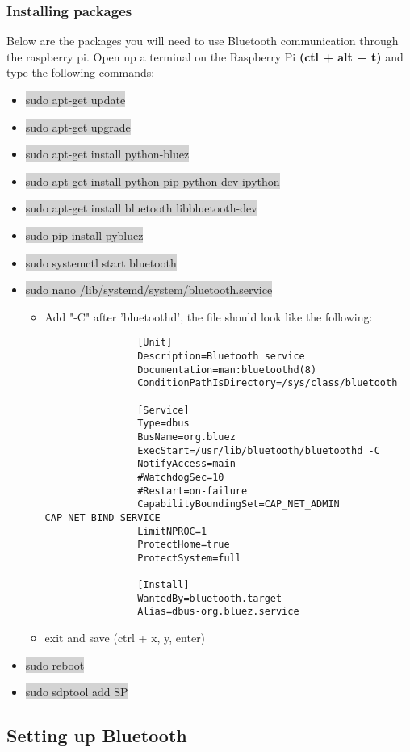 \documentclass[12pt]{article}
\begin{document}
\subsubsection{Installing packages}
Below are the packages you will need to use Bluetooth communication through the raspberry pi. Open up a terminal on the Raspberry Pi \textbf{(ctl + alt + t)} and type the following commands:
\begin{itemize}
	\item[] \colorbox{lightgray}{sudo apt-get update}
	\item[] \colorbox{lightgray}{sudo apt-get upgrade}
	\item[] \colorbox{lightgray}{sudo apt-get install python-bluez}
	\item[] \colorbox{lightgray}{sudo apt-get install python-pip python-dev ipython}
	\item[] \colorbox{lightgray}{sudo apt-get install bluetooth libbluetooth-dev}
	\item[] \colorbox{lightgray}{sudo pip install pybluez}
	\item[] \colorbox{lightgray}{sudo systemctl start bluetooth}
	\item[] \colorbox{lightgray}{sudo nano /lib/systemd/system/bluetooth.service}
		\begin{itemize}
			\item Add "-C" after 'bluetoothd', the file should look like the following:
			\begin{verbatim}
				[Unit]
				Description=Bluetooth service
				Documentation=man:bluetoothd(8)
				ConditionPathIsDirectory=/sys/class/bluetooth
				
				[Service]
				Type=dbus
				BusName=org.bluez
				ExecStart=/usr/lib/bluetooth/bluetoothd -C
				NotifyAccess=main
				#WatchdogSec=10
				#Restart=on-failure
				CapabilityBoundingSet=CAP_NET_ADMIN CAP_NET_BIND_SERVICE
				LimitNPROC=1
				ProtectHome=true
				ProtectSystem=full
				
				[Install]
				WantedBy=bluetooth.target
				Alias=dbus-org.bluez.service
			\end{verbatim}
			\item exit and save (ctrl + x, y, enter)
		\end{itemize}
	\item[] \colorbox{lightgray}{sudo reboot}
	\item[] \colorbox{lightgray}{sudo sdptool add SP}
\end{itemize}

\subsection{Setting up Bluetooth}
\end{document}
